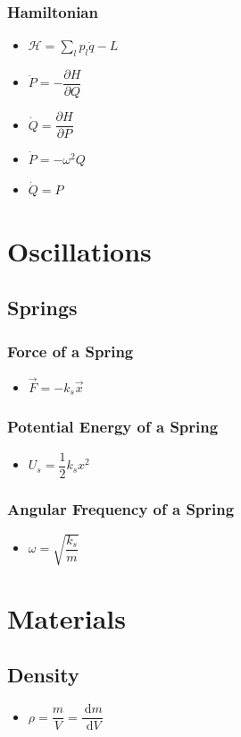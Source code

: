 \documentclass[]{report}
\newcommand \tab[1][1cm]{\hspace*{#1}}
\newcommand{\dn}[1]{\ \mathrm{d}#1}
\newcommand{\dd}[2]{ \dfrac{\dn #1}{\dn #2}}
\newcommand{\itemt}{\item \tab}
\begin{document}
\subsubsection{Hamiltonian}
\begin{itemize}
\itemt \( \mathcal{H} = \sum\limits_{l} p_l \dot{q} - L \)
\itemt \( \dot{P} = -\dfrac{\partial H}{\partial Q} \)		
\itemt \( \dot{Q} = \dfrac{\partial H}{\partial P} \)
\itemt \( \dot{P} = -\omega^2Q \)
\itemt \(\dot{Q} = P\)
\end{itemize}
				
	\section{Oscillations}

\subsection{Springs}

\subsubsection{Force of a Spring}
\begin{itemize}
\itemt \(\vec{F} = -k_s\vec{x}\)
\end{itemize}

\subsubsection{Potential Energy of a Spring}
\begin{itemize}
\itemt \( U_s = \dfrac{1}{2} k_s x^2 \)
\end{itemize}

\subsubsection{Angular Frequency of a Spring}
\begin{itemize}
\itemt \( \omega = \sqrt{\dfrac{k_s}{m}} \)
\end{itemize}

	\section{Materials}

\subsection{Density}
\begin{itemize}
\itemt \( \rho = \dfrac{m}{V} = \dd{m}{V} \)
\end{itemize}
				
\end{document}
